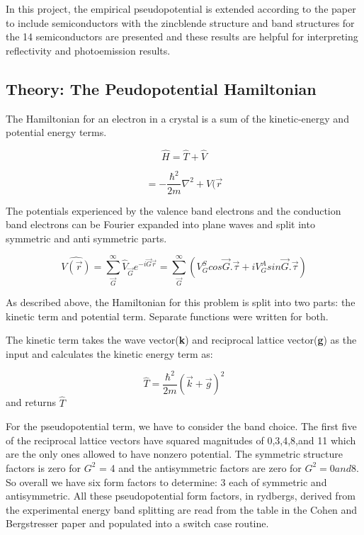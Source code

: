 \documentclass[%
 reprint,
 amsmath,amssymb,
 aps,
]{revtex4-2}
\begin{document}
In this project, the empirical pseudopotential is extended according to the paper to include semiconductors with the zincblende structure and band structures for the 14 semiconductors are presented and these results are helpful for interpreting reflectivity and photoemission results.


\subsection{\label{sec:level2}Theory: The Peudopotential Hamiltonian}
The Hamiltonian for an electron in a crystal is a sum of the kinetic-energy and potential energy terms. 

\begin{equation}
\hat{H} = \hat{T}+\hat{V}
\end{equation}

\begin{equation}
=-\frac{\hbar^2}{2m}\nabla^2 + V(\vec{r}
\end{equation}

The potentials experienced by the valence band electrons and the conduction band electrons can be Fourier expanded into plane waves and split into symmetric and anti symmetric parts. 

\begin{equation}
\hat{V(\vec{r})}= \sum_{\vec{G}}^\infty {\hat{V}_{\vec{G}}e^{-i\vec{G}\vec{r}}}
                = \sum_{\vec{G}}^\infty {(V_G^S cos{\vec{G}}.\vec{\tau}+ i V_G^A sin \vec{G}.\vec{\tau})}
\end{equation}

As described above, the Hamiltonian for this problem is split into two parts: the kinetic term and potential term. Separate functions were written for both.

The kinetic term takes the wave vector(\textbf{k}) and reciprocal lattice vector(\textbf{g}) as the input and calculates the kinetic energy term as: 

\begin {equation}
\hat{T} = \frac{\hbar^2}{2m}(\vec{k}+\vec{g})^2 
\end{equation}
and returns $\hat{T}$

For the pseudopotential term, we have to consider the band choice. The first five of the reciprocal lattice vectors have squared magnitudes of 0,3,4,8,and 11 which are the only ones allowed to have nonzero potential. The symmetric structure factors is zero for $G^2$ = 4 and the antisymmetric factors are zero for $G^2 = 0 and 8 $. So overall we have six form factors to determine: 3 each of symmetric and antisymmetric. All these pseudopotential form factors, in rydbergs, derived from the experimental energy band splitting are read from the table in the Cohen and Bergstresser paper and populated into a switch case routine. 
\end{document}
